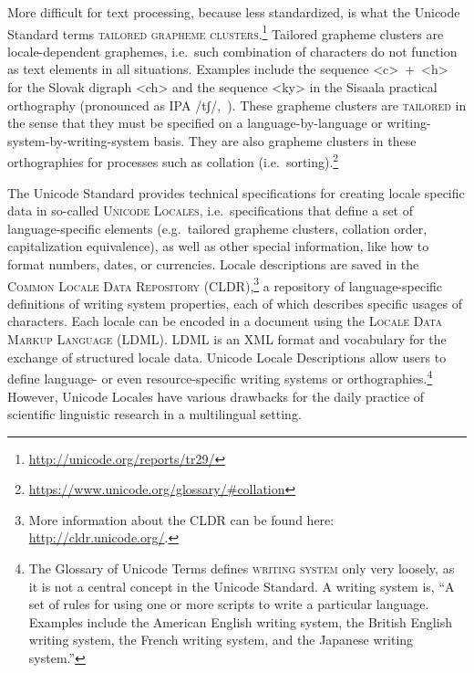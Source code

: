 More difficult for text processing, because less standardized, is what the
Unicode Standard terms \textsc{tailored grapheme clusters}.\footnote{\url{http://unicode.org/reports/tr29/}} 
Tailored grapheme clusters are locale-dependent graphemes, i.e.~such combination of characters do
not function as text elements in all situations. Examples include the sequence
<c>~+~<h> for the Slovak digraph <ch> and the sequence <ky> in the Sisaala
practical orthography (pronounced as IPA /tʃ/,~\cite{Moran2006}). These grapheme
clusters are \textsc{tailored} in the sense that they must be specified on a
language-by-language or writing-system-by-writing-system basis. They are also 
grapheme clusters in these orthographies for processes such as collation (i.e.\ sorting).\footnote{\url{https://www.unicode.org/glossary/\#collation}}

The Unicode Standard provides technical specifications for creating locale specific data
in so-called \textsc{Unicode Locales}, i.e.~specifications 
that define a set of language-specific elements (e.g.~tailored grapheme
clusters, collation order, capitalization equivalence), as well as other special
information, like how to format numbers, dates, or currencies. Locale
descriptions are saved in the \textsc{Common Locale Data Repository
(CLDR)},\footnote{More information about the CLDR can be found here:
\url{http://cldr.unicode.org/}.} a repository of
language-specific definitions of writing system properties, each of which
describes specific usages of characters. Each locale can be encoded in a
document using the \textsc{Locale Data Markup Language (LDML)}. LDML is an XML
format and vocabulary for the exchange of structured locale data. Unicode Locale
Descriptions allow users to define language- or even resource-specific writing
systems or orthographies.\footnote{The Glossary of Unicode Terms defines \textsc{writing
system} only very loosely, as it is not a central concept in the Unicode
Standard. A writing system is, ``A set of rules for using one or more scripts to
write a particular language. Examples include the American English writing
system, the British English writing system, the French writing system, and the
Japanese writing system.''} However, Unicode Locales have various drawbacks 
for the daily practice of scientific linguistic research in a multilingual setting.
